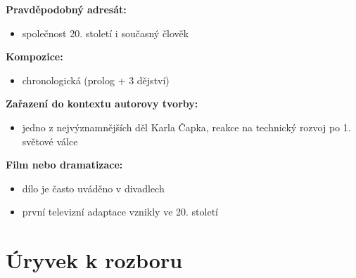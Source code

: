\documentclass[12pt,a4paper]{article}
\begin{document}
\begin{tcolorbox}[breakable]
\textbf{Pravděpodobný adresát:}
\begin{itemize}
\item společnost 20. století i současný člověk
\end{itemize}

\textbf{Kompozice:}
\begin{itemize}
\item chronologická (prolog + 3 dějství)
\end{itemize}

\textbf{Zařazení do kontextu autorovy tvorby:}
\begin{itemize}
\item jedno z nejvýznamnějších děl Karla Čapka, reakce na technický rozvoj po 1. světové válce
\end{itemize}

\textbf{Film nebo dramatizace:}
\begin{itemize}
\item dílo je často uváděno v divadlech
\item první televizní adaptace vznikly ve 20. století
\end{itemize}

\end{tcolorbox}

\section*{Úryvek k rozboru}
\end{document}
